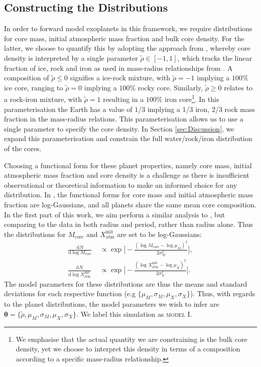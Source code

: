 \documentclass[fleqn,usenatbib]{mnras}
\begin{document}
\subsection{Constructing the Distributions} \label{sec:Distributions}
In order to forward model exoplanets in this framework, we require distributions for core mass, initial atmospheric mass fraction and bulk core density. For the latter, we choose to quantify this by adopting the approach from \cite{OwenMorton2016}, whereby core density is interpreted by a single parameter $\tilde{\rho} \in [-1,1]$, which tracks the linear fraction of ice, rock and iron as used in mass-radius relationships from \cite{Fortney2007}. A composition of $\tilde{\rho} \leq 0$ signifies a ice-rock mixture, with $\tilde{\rho} = -1$ implying a $100\%$ ice core, ranging to $\tilde{\rho} = 0$ implying a $100\%$ rocky core. Similarly, $\tilde{\rho} \geq 0$ relates to a rock-iron mixture, with $\tilde{\rho}=1$ resulting in a $100\%$ iron core\footnote{We emphasise that the actual quantity we are constraining is the bulk core density, yet we choose to interpret this density in terms of a composition according to a specific mass-radius relationship.}. In this parameterisation the Earth has a value of $1/3$ implying a 1/3 iron, 2/3 rock mass fraction in the \citet{Fortney2007} mass-radius relations. This parameterisation allows us to use a single parameter to specify the core density. In Section \ref{sec:Discussion}, we expand this parameterisation and constrain the full water/rock/iron distribution of the cores. 

Choosing a functional form for these planet properties, namely core mass, initial atmospheric mass fraction and core density is a challenge as there is insufficient observational or theoretical information to make an informed choice for any distribution. In \cite{Wu2019}, the functional forms for core mass and initial atmospheric mass fraction are log-Gaussians, and all planets share the same mean core composition. In the first part of this work, we aim perform a similar analysis to  \cite{Wu2019}, but comparing to the data in both radius and period, rather than radius alone. Thus the distributions for $M_\text{core}$ and $X_\text{atm}^\text{init}$ are set to be log-Gaussians:
\begin{equation} \label{eq:logGauss}
    \begin{split}
        \frac{\mathrm{d} N}{\mathrm{d} \log M_\text{core}} & \; \propto \exp \bigg[- \frac{(\log M_\text{core} - \log \mu_M )^2}{2\sigma^2_M}  \bigg], \\
        \frac{\mathrm{d} N}{\mathrm{d} \log X_\text{atm}^\text{init}} & \; \propto \exp \bigg[- \frac{(\log X_\text{atm}^\text{init} - \log \mu_X )^2}{2\sigma^2_X}  \bigg].
    \end{split}
\end{equation}
The model parameters for these distributions are thus the means and standard deviations for each respective function (e.g $\{ \mu_M, \sigma_M, \mu_X, \sigma_X \}$). Thus, with regards to the planet distributions, the model parameters we wish to infer are $\boldsymbol{\theta} = \{ \tilde{\rho}, \mu_M,  \sigma_M, \mu_X, \sigma_X \}$. We label this simulation as \textsc{model I}.
\end{document}
